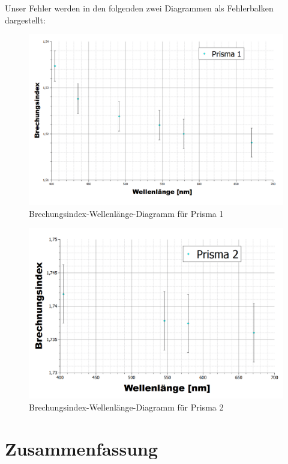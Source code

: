 \documentclass[fontsize=12pt]{scrartcl}
\begin{document}
Unser Fehler werden in den folgenden zwei Diagrammen als Fehlerbalken dargestellt:
\newpage
\begin{figure}[H]
\centering
\includegraphics[scale=0.45]{Graphik/Prisma1Fehler}
\caption{Brechungsindex-Wellenlänge-Diagramm für Prisma 1}
\end{figure}
\begin{figure}[H]
\vspace{-25pt}
\centering
\includegraphics[scale=0.45]{Graphik/Prisma2Fehler}
\caption{Brechungsindex-Wellenlänge-Diagramm für Prisma 2 }
\end{figure}
\newpage

\section{Zusammenfassung}
\end{document}
